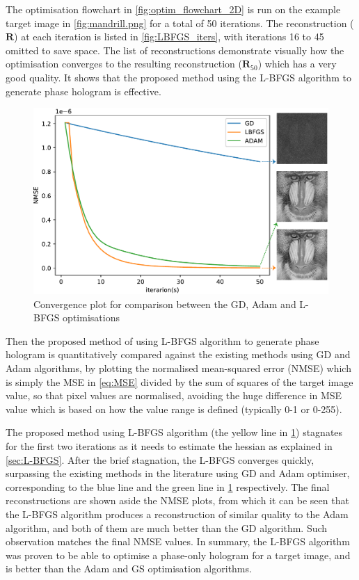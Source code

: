 The optimisation flowchart in \cref{fig:optim_flowchart_2D} is run on the example target image in \cref{fig:mandrill.png} for a total of 50 iterations. The reconstruction ($\textbf{R}$) at each iteration is listed in \cref{fig:LBFGS_iters}, with iterations 16 to 45 omitted to save space. The list of reconstructions demonstrate visually how the optimisation converges to the resulting reconstruction ($\textbf{R}_{50}$) which has a very good quality. It shows that the proposed method using the L-BFGS algorithm to generate phase hologram is effective.

\begin{figure}[H]
	\centering
	\includegraphics[width=\textwidth]{GD_ADAM_LBFGS.pdf}
	\caption{Convergence plot for comparison between the GD, Adam and L-BFGS optimisations}
	\label{fig:GD_ADAM_LBFGS}
\end{figure}

Then the proposed method of using L-BFGS algorithm to generate phase hologram is quantitatively compared against the existing methods using GD and Adam algorithms, by plotting the normalised mean-squared error (NMSE) which is simply the MSE in \cref{eq:MSE} divided by the sum of squares of the target image value, so that pixel values are normalised, avoiding the huge difference in MSE value which is based on how the value range is defined (typically 0-1 or 0-255).

The proposed method using L-BFGS algorithm (the yellow line in \cref{fig:GD_ADAM_LBFGS}) stagnates for the first two iterations as it needs to estimate the hessian as explained in \cref{sec:L-BFGS}. After the brief stagnation, the L-BFGS converges quickly, surpassing the existing methods in the literature using GD and Adam optimiser, corresponding to the blue line and the green line in \cref{fig:GD_ADAM_LBFGS} respectively. The final reconstructions are shown aside the NMSE plots, from which it can be seen that the L-BFGS algorithm produces a reconstruction of similar quality to the Adam algorithm, and both of them are much better than the GD algorithm. Such observation matches the final NMSE values. In summary, the L-BFGS algorithm was proven to be able to optimise a phase-only hologram for a target image, and is better than the Adam and GS optimisation algorithms.


